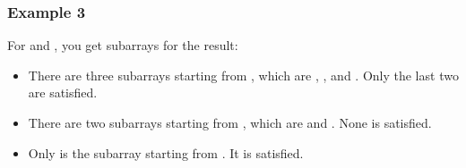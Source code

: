 \documentclass[letterpaper,12pt,english]{book}
\begin{document}
\subsubsection{Example 3}
\label{\detokenize{Prefix_Sum/560_Subarray_Sum_Equals_K:example-3}}
\sphinxAtStartPar
For  and , you get  subarrays for the result:
\begin{itemize}
\item {} 
\sphinxAtStartPar
There are three subarrays starting from , which are \sphinxcode{\sphinxupquote{{[}1{]}}}, \sphinxcode{\sphinxupquote{{[}1, \sphinxhyphen{}1{]}}}, and \sphinxcode{\sphinxupquote{{[}1, \sphinxhyphen{}1, 0{]}}}. Only the last two are satisfied.

\item {} 
\sphinxAtStartPar
There are two subarrays starting from , which are \sphinxcode{\sphinxupquote{{[}\sphinxhyphen{}1{]}}} and \sphinxcode{\sphinxupquote{{[}\sphinxhyphen{}1, 0{]}}}. None is satisfied.

\item {} 
\sphinxAtStartPar
Only \sphinxcode{\sphinxupquote{{[}0{]}}} is the subarray starting from . It is satisfied.

\end{itemize}
\end{document}
